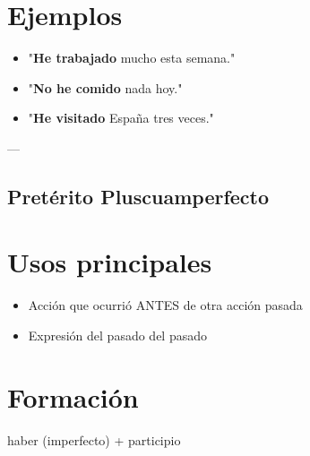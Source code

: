 \documentclass[a4paper,11pt]{article}
\begin{document}
\vspace{0.2cm}

\section{Ejemplos}

\begin{itemize}

  \item "\textbf{He trabajado} mucho esta semana."

  \item "\textbf{No he comido} nada hoy."

  \item "\textbf{He visitado} España tres veces."

\end{itemize}

\vspace{0.2cm}

---

\vspace{0.2cm}

\subsection{Pretérito Pluscuamperfecto}

\vspace{0.2cm}

\section{Usos principales}

\begin{itemize}

  \item Acción que ocurrió ANTES de otra acción pasada

  \item Expresión del pasado del pasado

\end{itemize}

\vspace{0.2cm}

\section{Formación}

haber (imperfecto) + participio

\vspace{0.2cm}
\end{document}
